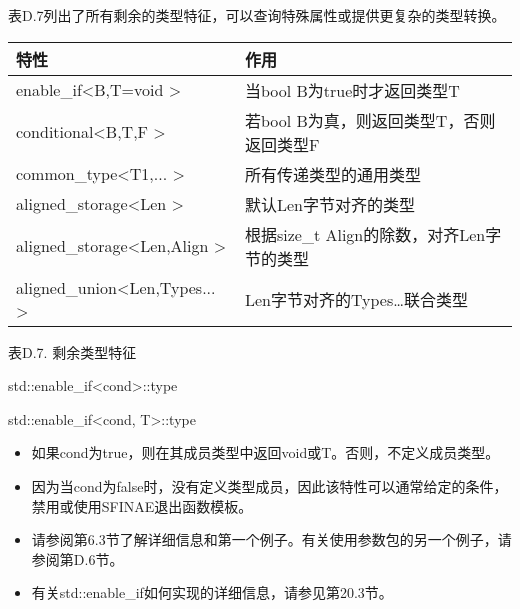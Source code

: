 

表D.7列出了所有剩余的类型特征，可以查询特殊属性或提供更复杂的类型转换。

\begin{table}[H]
	\begin{center}
	\begin{tabular}{l|l}
		\hline
		\textbf{特性}                                       & \textbf{作用}                                                   \\ \hline
		enable\_if\textless{}B,T=void \textgreater{}         & 当bool B为true时才返回类型T                              \\ \hline
		conditional\textless{}B,T,F \textgreater{}           & 若bool B为真，则返回类型T，否则返回类型F              \\ \hline
		common\_type\textless{}T1,... \textgreater{}         & 所有传递类型的通用类型                                   \\ \hline
		aligned\_storage\textless{}Len \textgreater{}        & 默认Len字节对齐的类型                          \\ \hline
		aligned\_storage\textless{}Len,Align \textgreater{}  & 根据size\_t Align的除数，对齐Len字节的类型 \\ \hline
		aligned\_union\textless{}Len,Types... \textgreater{} & Len字节对齐的Types…联合类型                 \\ \hline
	\end{tabular}
	\end{center}
\end{table}

\begin{center}
表D.7. 剩余类型特征
\end{center}

std::enable\_if<cond>::type

std::enable\_if<cond, T>::type

\begin{itemize}
\item
如果cond为true，则在其成员类型中返回void或T。否则，不定义成员类型。

\item
因为当cond为false时，没有定义类型成员，因此该特性可以通常给定的条件，禁用或使用SFINAE退出函数模板。

\item
请参阅第6.3节了解详细信息和第一个例子。有关使用参数包的另一个例子，请参阅第D.6节。

\item
有关std::enable\_if如何实现的详细信息，请参见第20.3节。
\end{itemize}


